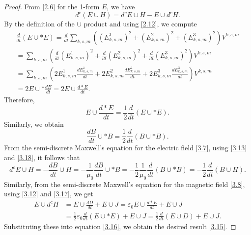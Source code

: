 \documentclass[10pt,a4paper]{amsart}
\begin{document}
\begin{proof}
From \eqref{2.6} for the 1-form $E$, we have
\begin{equation}\label{3.16}
d^c(E\cup H)=d^cE\cup H-E\cup d^cH.
\end{equation}
By the definition of the $\cup$ product and using \eqref{2.12}, we  compute
\begin{align*}\label{}
\frac{d}{dt}(E\cup\ast E)=\frac{d}{dt}\sum_{k,s,m}\left((E^1_{k,s,m})^2+(E^2_{k,s,m})^2+(E^3_{k,s,m})^2\right)V^{k,s,m}\\
=\sum_{k,s,m}\left(\frac{d}{dt}(E^1_{k,s,m})^2+\frac{d}{dt}(E^2_{k,s,m})^2+\frac{d}{dt}(E^3_{k,s,m})^2\right)V^{k,s,m} \\
=\sum_{k,s,m}\left(2E^1_{k,s,m}\frac{dE^1_{k,s,m}}{dt}+2E^2_{k,s,m}\frac{dE^2_{k,s,m}}{dt}+2E^3_{k,s,m}\frac{dE^3_{k,s,m}}{dt}\right)V^{k,s,m}\\
=2E\cup\ast\frac{dE}{dt}=2E\cup\frac{d\ast E}{dt}.
\end{align*}
Therefore,
\begin{equation}\label{3.17}
E\cup\frac{d\ast E}{dt}=\frac{1}{2}\frac{d}{dt}(E\cup\ast E).
\end{equation}
Similarly, we obtain
\begin{equation}\label{3.18}
\frac{dB}{dt} \cup\ast B=\frac{1}{2}\frac{d}{dt}(B\cup\ast B).
\end{equation}
From the semi-discrete Maxwell's equation for the electric field \eqref{3.7}, using \eqref{3.13} and  \eqref{3.18}, it follows that
\begin{equation*}
d^cE\cup H=-\frac{dB}{dt}\cup H=-\frac{1}{\mu_0}\frac{dB}{dt}\cup\ast B=-\frac{1}{2}\frac{1}{\mu_0}\frac{d}{dt}(B\cup\ast B)=-\frac{1}{2}\frac{d}{dt}(B\cup H).
\end{equation*}
Similarly, from the semi-discrete Maxwell's equation for the magnetic field \eqref{3.8}, using \eqref{3.12}  and \eqref{3.17}, we get
\begin{align*}\label{}
E\cup d^cH&=E\cup \frac{dD}{dt}+E\cup J=\varepsilon_0E\cup \frac{d\ast E}{dt}+E\cup J \\&=\frac{1}{2}\varepsilon_0\frac{d}{dt}(E\cup\ast E)+E\cup J=\frac{1}{2}\frac{d}{dt}(E\cup D)+E\cup J.
\end{align*}
Substituting these into equation \eqref{3.16}, we obtain the desired result \eqref{3.15}.
\end{proof}
\end{document}
